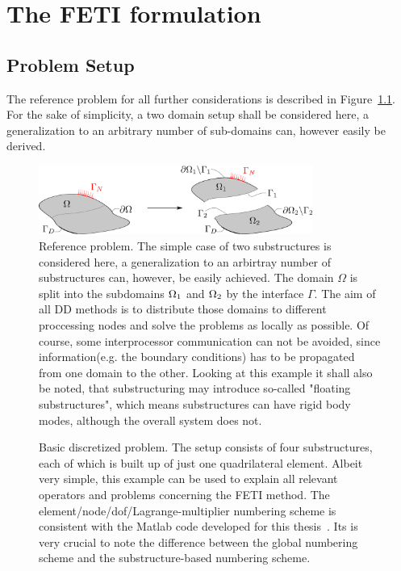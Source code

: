 \chapter{The FETI formulation}\label{cha:feti_formulation}
\section{Problem Setup}
The reference problem for all further considerations is described in Figure~\ref{fig:reference_problem}. For the sake of simplicity, a two domain setup shall be considered here, a generalization to an arbitrary number of sub-domains can, however easily be derived.


\begin{figure}[h]
  \centering
  \includegraphics[width=0.8\textwidth]{./fig/eps/drawing1}
  \caption[Domain decomposition reference problem]{Reference problem. The simple case of two substructures is considered here, a generalization to an arbirtray number of substructures can, however, be easily achieved. The domain $\Omega$ is split into the subdomains $\Omega_1$ and $\Omega_2$ by the interface $\Gamma$. The aim of all DD methods is to distribute those domains to different proccessing nodes and solve the problems as locally as possible. Of course, some interprocessor communication can not be avoided, since information(e.g. the boundary conditions) has to be propagated from one domain to the other. Looking at this example it shall also be noted, that substructuring may introduce so-called "floating substructures", which means substructures can have rigid body modes, although the overall system does not.}\label{fig:reference_problem}
\end{figure}
\begin{figure}[h!]
  \begin{center}
    
    \caption[Simple discretized problem]{Basic discretized problem. The setup consists of four substructures, each of which is built up of just one quadrilateral element. Albeit very simple, this example can be used to explain all relevant operators and problems concerning the FETI method. The element/node/dof/Lagrange-multiplier numbering scheme is consistent with the Matlab code developed for this thesis~\cite{FEMAC}. Its is very crucial to note the difference between the global numbering scheme and the substructure-based numbering scheme. }
    \label{fig:simple_discretized_example}
  \end{center}
\end{figure}


